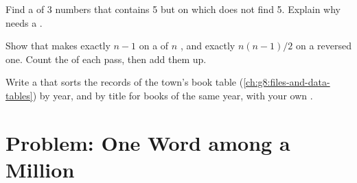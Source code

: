 \begin{exercise}[$\star\star\star$]\label{exo:g8:searching-and-sorting:10}
Find a  of 3 numbers that contains 5 but on which  does not
find 5. Explain why  needs a .
\end{exercise}

\begin{exercise}[$\star\star\star$]\label{exo:g8:searching-and-sorting:11}
Show that  makes exactly $n - 1$  on a  of
$n$ , and exactly $n(n-1)/2$ on a reversed one. Count the  of
each pass, then add them up.
\end{exercise}

\begin{exercise}[$\star\star\star$]\label{exo:g8:searching-and-sorting:12}
Write a   that sorts the records of the town's
book table (\cref{ch:g8:files-and-data-tables}) by year, and by title for
books of the same year, with your own .
\end{exercise}

\section{Problem: One Word among a Million}

